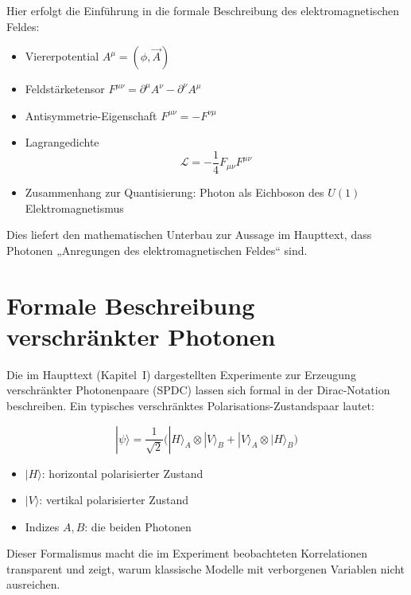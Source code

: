Hier erfolgt die Einführung in die formale Beschreibung des elektromagnetischen
Feldes:

\begin{itemize}
	\item Viererpotential $A^\mu = (\phi, \vec{A})$
	\item Feldstärketensor $F^{\mu\nu} = \partial^\mu A^\nu - \partial^\nu A^\mu$
	\item Antisymmetrie-Eigenschaft $F^{\mu\nu} = -F^{\nu\mu}$
	\item Lagrangedichte
	\[
	\mathcal{L} = -\frac{1}{4} F_{\mu\nu}F^{\mu\nu}
	\]
	\item Zusammenhang zur Quantisierung: Photon als Eichboson des $U(1)$
	Elektromagnetismus
\end{itemize}

Dies liefert den mathematischen Unterbau zur Aussage im Haupttext, dass
Photonen „Anregungen des elektromagnetischen Feldes“ sind.

\section{Formale Beschreibung verschränkter Photonen}
\label{anhangA:verschr}

Die im Haupttext (Kapitel~I) dargestellten Experimente zur Erzeugung
verschränkter Photonenpaare (SPDC) lassen sich formal in der
Dirac-Notation beschreiben. Ein typisches verschränktes
Polarisations-Zustandspaar lautet:

\[
|\psi\rangle = \frac{1}{\sqrt{2}}\big( |H\rangle_A \otimes |V\rangle_B +
|V\rangle_A \otimes |H\rangle_B \big)
\]

\begin{itemize}
	\item $|H\rangle$: horizontal polarisierter Zustand
	\item $|V\rangle$: vertikal polarisierter Zustand
	\item Indizes $A, B$: die beiden Photonen
\end{itemize}

Dieser Formalismus macht die im Experiment beobachteten Korrelationen
transparent und zeigt, warum klassische Modelle mit verborgenen Variablen
nicht ausreichen.

